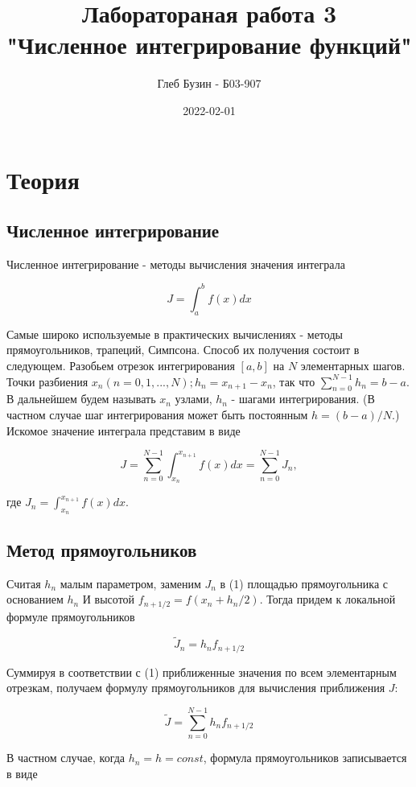 \documentclass[a4paper,11pt]{article}
\title{
    Лаборатораная работа 3 \\
    "Численное интегрирование функций"
}
\date{2022-02-01}
\author{Глеб Бузин - Б03-907}
\begin{document}
\maketitle
\newpage
\tableofcontents
\newpage


\section{Теория}

\subsection{Численное интегрирование}

Численное интегрирование - методы вычисления значения интеграла

$$
J=\int ^{b}_{a}f\left( x\right) dx
$$

Самые широко используемые в практических вычислениях - методы прямоугольников, трапеций, Симпсона.
Способ их получения состоит в следующем. Разобьем отрезок интегрирования $[a, b]$ на $N$ элементарных шагов. Точки разбиения $x_n(n = 0,1,...,N); h_n = x_{n+1} - x_n$, так что
$\sum_{n = 0}^{N - 1}h_n = b - a $.
В дальнейшем будем называть $ x_n $ узлами, $h_n$ - шагами интегрирования.
(В частном случае шаг интегрирования может быть постоянным $h = (b - a)/N$.) Искомое значение интеграла представим в виде

\begin{equation}
J=\sum ^{N-1}_{n=0}\int ^{x_{n+1}}_{x_{n}}f\left( x\right) dx= \sum ^{N-1}_{n=0}J_{n},
\end{equation}

где $ J_n = \int ^{x_{n+1}}_{x_{n}}f\left( x\right) dx$.

\subsection{Метод прямоугольников}

Считая $h_n$ малым параметром, заменим $J_n$ в (1) площадью прямоугольника с основанием $h_n$ И высотой $f_{n+1/2} = f(x_n + h_n/2)$. Тогда придем к локальной формуле прямоугольников

$$
\tilde{J}_{n}=h_n f_{n+1/2}
$$

Суммируя в соответствии с (1) приближенные значения по всем элементарным отрезкам, получаем формулу прямоугольников для вычисления приближения $J$:

$$
\tilde{J} = \sum_{n=0}^{N-1} h_n f_{n+1/2}
$$

В частном случае, когда $h_n = h = const$, формула прямоугольников
записывается в виде
\end{document}
